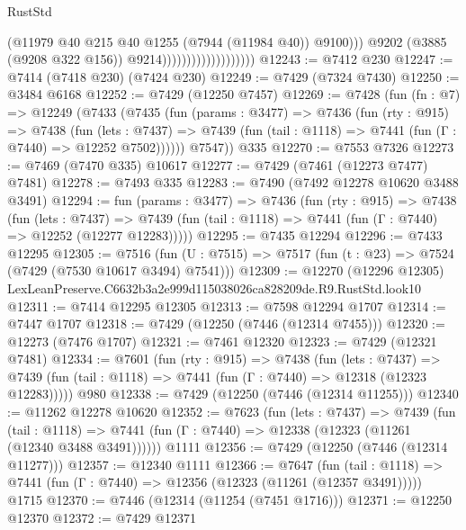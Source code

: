 \begin{lexlean}{RustStd}
\begin{coremodule}
                                              (@11979
                                                @40
                                                @215
                                                @40
                                                @1255
                                                (@7944 (@11984 @40))
                                                @9100)))
                                          @9202
                                          (@3885 (@9208 @322 @156))
                                          @9214)))))))))))))))))))
@12243 := @7412 @230
@12247 := @7414 (@7418 @230) (@7424 @230)
@12249 := @7429 (@7324 @7430)
@12250 := @3484 @6168
@12252 := @7429 (@12250 @7457)
@12269 := @7428
    (fun (fn : @7) =>
    @12249
      (@7433
        (@7435
          (fun (params : @3477) =>
          @7436
            (fun (rty : @915) =>
            @7438
              (fun (lets : @7437) =>
              @7439 (fun (tail : @1118) => @7441 (fun (Γ : @7440) => @12252 @7502))))))
        @7547))
    @335
@12270 := @7553 @7326
@12273 := @7469 (@7470 @335) @10617
@12277 := @7429 (@7461 (@12273 @7477) @7481)
@12278 := @7493 @335
@12283 := @7490 (@7492 @12278 @10620 @3488 @3491)
@12294 := fun (params : @3477) =>
  @7436
    (fun (rty : @915) =>
    @7438
      (fun (lets : @7437) =>
      @7439 (fun (tail : @1118) => @7441 (fun (Γ : @7440) => @12252 (@12277 @12283)))))
@12295 := @7435 @12294
@12296 := @7433 @12295
@12305 := @7516
    (fun (U : @7515) => @7517 (fun (t : @23) => @7524 (@7429 (@7530 @10617 @3494) @7541)))
@12309 := @12270 (@12296 @12305) LexLeanPreserve.C6632b3a2e999d115038026ca828209de.R9.RustStd.look10
@12311 := @7414 @12295 @12305
@12313 := @7598 @12294 @1707
@12314 := @7447 @1707
@12318 := @7429 (@12250 (@7446 (@12314 @7455)))
@12320 := @12273 (@7476 @1707)
@12321 := @7461 @12320
@12323 := @7429 (@12321 @7481)
@12334 := @7601
    (fun (rty : @915) =>
    @7438
      (fun (lets : @7437) =>
      @7439 (fun (tail : @1118) => @7441 (fun (Γ : @7440) => @12318 (@12323 @12283)))))
    @980
@12338 := @7429 (@12250 (@7446 (@12314 @11255)))
@12340 := @11262 @12278 @10620
@12352 := @7623
    (fun (lets : @7437) =>
    @7439
      (fun (tail : @1118) =>
      @7441 (fun (Γ : @7440) => @12338 (@12323 (@11261 (@12340 @3488 @3491))))))
    @1111
@12356 := @7429 (@12250 (@7446 (@12314 @11277)))
@12357 := @12340 @1111
@12366 := @7647
    (fun (tail : @1118) => @7441 (fun (Γ : @7440) => @12356 (@12323 (@11261 (@12357 @3491)))))
    @1715
@12370 := @7446 (@12314 (@11254 (@7451 @1716)))
@12371 := @12250 @12370
@12372 := @7429 @12371

\end{coremodule}
\end{lexlean}
